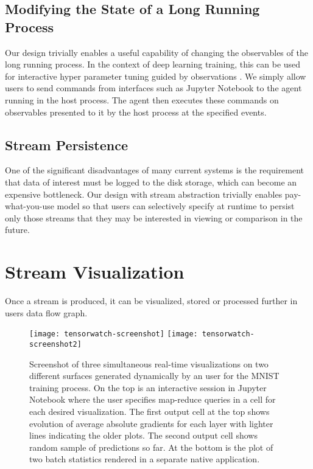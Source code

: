\documentclass[sigchi]{acmart}
\begin{document}
\subsection{Modifying the State of a Long Running Process}
Our design trivially enables a useful capability of changing the observables of the long running process. In the context of deep learning training, this can be used for interactive hyper parameter tuning guided by observations \cite{NIPS2011_4443}. We simply allow users to send commands from interfaces such as Jupyter Notebook to the agent running in the host process. The agent then executes these commands on observables presented to it by the host process at the specified events.

\subsection{Stream Persistence}
One of the significant disadvantages of many current systems is the requirement that data of interest must be logged to the disk storage, which can become an expensive bottleneck. Our design with stream abstraction trivially enables pay-what-you-use model so that users can selectively specify at runtime to persist only those streams that they may be interested in viewing or comparison in the future.

\section{Stream Visualization}
Once a stream is produced, it can be visualized, stored or processed further in users data flow graph. 

\begin{figure}[h]
  \centering
  \texttt{[image: tensorwatch-screenshot]}
  \texttt{[image: tensorwatch-screenshot2]}  
  \caption{Screenshot of three simultaneous real-time visualizations on two different surfaces generated dynamically by an user for the MNIST training process. On the top is an interactive session in Jupyter Notebook where the user specifies map-reduce queries in a cell for each desired visualization. The first output cell at the top shows evolution of average absolute gradients for each layer with lighter lines indicating the older plots. The second output cell shows random sample of predictions so far. At the bottom is the plot of two batch statistics rendered in a separate native application.}  
\end{figure}
\end{document}
